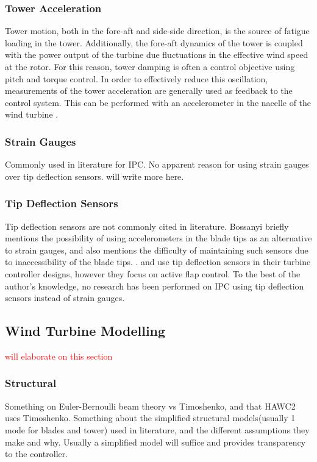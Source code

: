 \subsubsection{Tower Acceleration}
Tower motion, both in the fore-aft and side-side direction, is the source of fatigue loading in the tower. Additionally, the fore-aft dynamics of the tower is coupled with the power output of the turbine due fluctuations in the effective wind speed at the rotor. For this reason, tower damping is often a control objective using pitch and torque control. In order to effectively reduce this oscillation, measurements of the tower acceleration are generally used as feedback to the control system. This can be performed with an accelerometer in the nacelle of the wind turbine \cite{15_bossanyi}.
\subsubsection{Strain Gauges}
Commonly used in literature for IPC. No apparent reason for using strain gauges over tip deflection sensors. will write more here.
\subsubsection{Tip Deflection Sensors}
Tip deflection sensors are not commonly cited in literature. Bossanyi briefly mentions the possibility of using accelerometers in the blade tips as an alternative to strain gauges, and also mentions the difficulty of maintaining such sensors due to inaccessibility of the blade tips. \cite{5_Bossanyi} \cite{15_bossanyi}. \citet{7_Berg} and \citet{10_Wilson} use tip deflection sensors in their turbine controller designs, however they focus on active flap control. To the best of the author's knowledge, no research has been performed on IPC using tip deflection sensors instead of strain gauges. 
\subsection{Wind Turbine Modelling}
\textcolor{red}{will elaborate on this section}
\subsubsection{Structural}
Something on Euler-Bernoulli beam theory vs Timoshenko, and that HAWC2 uses Timoshenko. Something about the simplified structural models(usually 1 mode for blades and tower) used in literature, and the different assumptions they make and why. Usually a simplified model will suffice and provides transparency to the controller.
